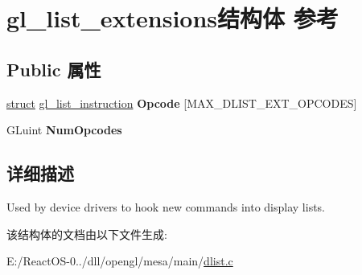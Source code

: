 \hypertarget{structgl__list__extensions}{}\section{gl\+\_\+list\+\_\+extensions结构体 参考}
\label{structgl__list__extensions}
\subsection*{Public 属性}
\begin{DoxyCompactItemize}
\item 
\mbox{\label{structgl__list__extensions_a5e728f98b1dd03d75abe10996c326e7d}} 
\hyperlink{interfacestruct}{struct} \hyperlink{structgl__list__instruction}{gl\+\_\+list\+\_\+instruction} {\bfseries Opcode} \mbox{[}M\+A\+X\+\_\+\+D\+L\+I\+S\+T\+\_\+\+E\+X\+T\+\_\+\+O\+P\+C\+O\+D\+ES\mbox{]}
\item 
\mbox{\label{structgl__list__extensions_a5b63352a007e1faea39872d2b949d858}} 
G\+Luint {\bfseries Num\+Opcodes}
\end{DoxyCompactItemize}


\subsection{详细描述}
Used by device drivers to hook new commands into display lists. 

该结构体的文档由以下文件生成\+:\begin{DoxyCompactItemize}
\item 
E\+:/\+React\+O\+S-\/0../dll/opengl/mesa/main/\hyperlink{dlist_8c}{dlist.\+c}\end{DoxyCompactItemize}
